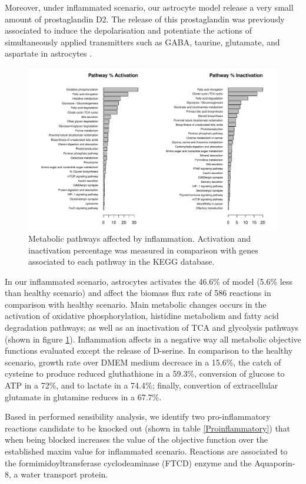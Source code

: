 Moreover, under inflammated scenario, our astrocyte model release a very small amount of prostaglandin D2. The release of this prostaglandin was previously associated to induce the depolarisation and potentiate the actions of simultaneously applied transmitters such as GABA, taurine, glutamate, and aspartate in astrocytes \cite{Murphy1988}.
\begin{figure}[h]
\begin{center}
\includegraphics[width=\textwidth]{neuroprotective/Healthy2Inflammated}
\end{center}
\caption{Metabolic pathways affected by inflammation. Activation and inactivation percentage was measured in comparison with genes associated to each pathway in the KEGG database.}
\label{h2i}
\end{figure}

In our inflammated scenario, astrocytes activates the 46.6\% of model (5.6\% less than healthy scenario) and affect the biomass flux rate of 586 reactions in comparison with healthy scenario. Main metabolic changes occurs in the activation of oxidative phosphorylation, histidine metabolism and fatty acid degradation pathways; as well as an inactivation of TCA and glycolysis pathways (shown in figure \ref{h2i}). Inflammation affects in a negative way all metabolic objective functions evaluated except the release of D-serine. In comparison to the healthy scenario, growth rate over DMEM medium decreace in a 15.6\%, the catch of cysteine to produce reduced gluthathione in a 59.3\%, conversion of glucose to ATP in a 72\%, and to lactate in a 74.4\%; finally, convertion of extracellular glutamate in glutamine reduces in a 67.7\%. 

Based in performed sensibility analysis, we identify two pro-inflammatory reactions candidate to be knocked out (shown in table \ref{Proinflammatory}) that when being blocked increases the value of the objective function over the established maxim value for inflammated scenario. Reactions are associated to the formimidoyltransferase cyclodeaminase (FTCD) enzyme and the Aquaporin-8, a water transport protein.

